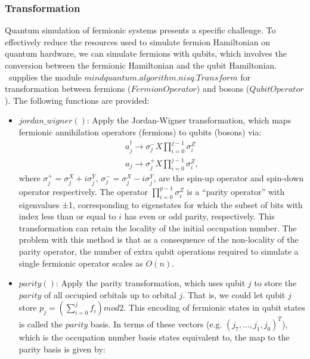 \subsubsection{Transformation}
Quantum simulation of fermionic systems presents a specific challenge. To effectively reduce the resources used to simulate fermion Hamiltonian on quantum hardware, we can simulate fermions with qubits, which involves the conversion between the fermionic Hamiltonian and the qubit Hamiltonian. \MindQuantum\ supplies the module $mindquantum.algorithm.nisq.Transform$ for transformation between fermions ($FermionOperator$) and bosons ($QubitOperator$). The following functions are provided:
\begin{itemize}
    \item $jordan\_wigner()$: Apply the Jordan-Wigner transformation, which maps fermionic annihilation operators (fermions) to qubits (bosons) via:
          \begin{equation}
              \begin{split}
                  a_j^{\dagger} \to {\sigma}_j^{-} X \prod_{i=0}^{j-1} {\sigma}^Z_i \\
                  a_j \to {\sigma}_j^{+} X \prod_{i=0}^{j-1} {\sigma}^Z_i,
              \end{split}
          \end{equation}
          where ${\sigma}_j^{+} = {\sigma}_j^X+i{\sigma}_j^Y$, ${\sigma}_j^{-} = {\sigma}_j^X-i{\sigma}_j^Y$, are the spin-up operator and spin-down operator respectively. The operator $\prod_{i=0}^{p-1} {{\sigma}^Z_i}$ is a “parity operator” with eigenvalues ±1, corresponding to eigenstates for which the subset of bits with index less than or equal to $i$ has even or odd parity, respectively. This transformation can retain the locality of the initial occupation number. The problem with this method is that as a consequence of the non-locality of the parity operator, the number of extra qubit operations required to simulate a single fermionic operator scales as $O(n)$.
    \item $parity()$: Apply the parity transformation, which uses qubit $j$ to store the $parity$ of all occupied orbitals up to orbital $j$. That is, we could let qubit $j$ store $p_j = (\sum_{i=0}^j f_i) mod 2$. This encoding of fermionic states in qubit states is called the $parity$ basis. In terms of these vectors (e.g. $(j_7,...,j_1,j_0)^T$), which is the occupation number basis states equivalent to, the map to the parity basis is given by:
          \begin{equation}

\end{equation}
\end{itemize}
